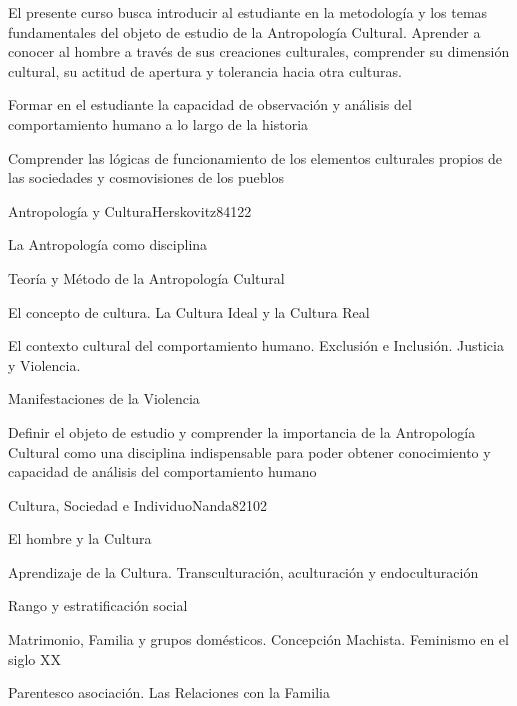 \begin{syllabus}


\begin{justification}    
El presente curso busca introducir al estudiante en la metodología y los temas fundamentales del 
objeto de estudio de la Antropología Cultural. Aprender a conocer al hombre a través de sus 
creaciones culturales, comprender su dimensión cultural, su actitud de apertura y 
tolerancia hacia otra culturas.
\end{justification}

\begin{goals}
\item Formar en el estudiante la capacidad de observación y análisis del comportamiento humano a lo largo de la historia  
\item Comprender las lógicas de funcionamiento de los elementos culturales propios de las sociedades y cosmovisiones de los pueblos
\end{goals}

\begin{outcomes}
\end{outcomes}

\begin{unit}{Antropología y Cultura}{Herskovitz84}{12}{2}
   \begin{topics}
      \item La Antropología como disciplina
	\item Teoría y Método de la Antropología Cultural
	\item El concepto de cultura. La Cultura Ideal y la Cultura Real
	\item El contexto cultural del comportamiento humano. Exclusión e Inclusión. Justicia y Violencia.
	\item Manifestaciones de la Violencia
   \end{topics}

   \begin{learningoutcomes}
      \item Definir el objeto de estudio y comprender la importancia de la Antropología Cultural como una disciplina indispensable para poder obtener conocimiento y capacidad de análisis del comportamiento humano
   \end{learningoutcomes}
\end{unit}

\begin{unit}{Cultura, Sociedad e Individuo}{Nanda82}{10}{2}
   \begin{topics}
      \item El hombre y la Cultura
	\item Aprendizaje de la Cultura. Transculturación, aculturación y endoculturación
	\item Rango y estratificación social
	\item Matrimonio, Familia y grupos domésticos. Concepción Machista. Feminismo en el siglo XX
	\item Parentesco asociación. Las Relaciones con la Familia
   \end{topics}


\end{unit}
\end{syllabus}
